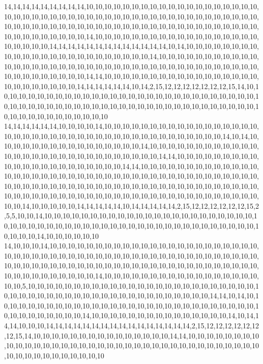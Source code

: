 14,14,14,14,14,14,14,14,14,10,10,10,10,10,10,10,10,10,10,10,10,10,10,10,10,10,10,10,10,10,10,10,10,10,10,10,10,10,10,10,10,10,10,10,10,10,10,10,10,10,10,10,10,10,10,10,10,10,10,10,10,10,10,10,10,10,10,10,10,10,10,10,10,10,10,10,10,10,10,10,10,10,10,10,10,10,10,10,10,10,10,10,10,14,10,10,10,10,10,10,10,10,10,10,10,10,10,10,10,10,10,10,10,10,10,10,10,14,14,14,14,14,14,14,14,14,14,14,14,14,10,14,10,10,10,10,10,10,10,10,10,10,10,10,10,10,10,10,10,10,10,10,10,10,10,10,14,10,10,10,10,10,10,10,10,10,10,10,10,10,10,10,10,10,10,10,10,10,10,10,10,10,10,10,10,10,10,10,10,10,10,10,10,10,10,10,10,10,10,10,10,10,10,10,10,14,14,10,10,10,10,10,10,10,10,10,10,10,10,10,10,10,10,10,10,10,10,10,10,10,10,10,14,14,14,14,14,14,10,14,2,15,12,12,12,12,12,12,12,15,14,10,10,10,10,10,10,10,10,10,10,10,10,10,10,10,10,10,10,10,10,10,10,10,10,10,10,10,10,10,10,10,10,10,10,10,10,10,10,10,10,10,10,10,10,10,10,10,10,10,10,10,10,10,10,10,10,10,10,10,10,10,10,10,10,10,10,10,10,10
14,14,14,14,14,14,10,10,10,10,14,10,10,10,10,10,10,10,10,10,10,10,10,10,10,10,10,10,10,10,10,10,10,10,10,10,10,10,10,10,10,10,10,10,10,10,10,10,10,10,10,10,14,10,14,10,10,10,10,10,10,10,10,10,10,10,10,10,10,10,10,14,10,10,10,10,10,10,10,10,10,10,10,10,10,10,10,10,10,10,10,10,10,10,10,10,10,10,10,10,10,14,14,10,10,10,10,10,10,10,10,10,10,10,10,10,10,10,10,10,10,10,10,10,10,14,14,10,10,10,10,10,10,10,10,10,10,10,10,10,10,10,10,10,10,10,10,10,10,10,10,10,10,10,10,10,10,10,10,10,10,10,10,10,10,10,10,10,10,10,10,10,10,10,10,10,10,10,10,10,10,10,10,10,10,10,10,10,10,10,10,10,10,10,10,10,10,10,10,10,10,10,10,10,10,10,10,10,10,10,10,10,10,10,10,10,10,10,10,10,10,10,10,10,10,10,14,10,10,10,10,10,14,14,14,14,14,10,14,14,14,14,14,2,15,12,12,12,12,12,12,15,2,5,5,10,10,14,10,10,10,10,10,10,10,10,10,10,10,10,10,10,10,10,10,10,10,10,10,10,10,10,10,10,10,10,10,10,10,10,10,10,10,10,10,10,10,10,10,10,10,10,10,10,10,10,10,10,10,10,10,10,10,14,10,10,10,10,10,10
14,10,10,10,14,10,10,10,10,10,10,10,10,10,10,10,10,10,10,10,10,10,10,10,10,10,10,10,10,10,10,10,10,10,10,10,10,10,10,10,10,10,10,10,10,10,10,10,10,10,10,10,10,10,10,10,10,10,10,10,10,10,10,10,10,10,10,10,10,10,10,10,10,10,10,10,10,10,10,10,10,10,10,10,10,10,10,10,10,10,10,10,10,10,14,10,10,10,10,10,10,10,10,10,10,10,10,10,10,10,10,10,10,10,5,10,10,10,10,10,10,10,10,10,10,10,10,10,10,10,10,10,10,10,10,10,10,10,10,10,10,10,10,10,10,10,10,10,10,10,10,10,10,10,10,10,10,10,10,10,10,10,10,14,14,10,14,10,10,10,10,10,10,10,10,10,10,10,10,10,10,10,10,10,10,10,10,10,10,10,10,10,10,10,10,10,10,10,10,10,10,10,10,10,10,14,10,10,10,10,10,10,10,10,10,10,10,10,10,10,10,14,10,14,14,14,10,10,10,14,14,14,14,14,14,14,14,14,14,14,14,14,14,14,14,2,15,12,12,12,12,12,12,12,15,14,10,10,10,10,10,10,10,10,10,10,10,10,10,10,10,14,14,10,10,10,10,10,10,10,10,10,10,10,10,10,10,10,10,10,10,10,10,10,10,10,10,10,10,10,10,10,10,10,10,10,10,10,10,10,10,10,10,10,10,10,10,10,10,10
